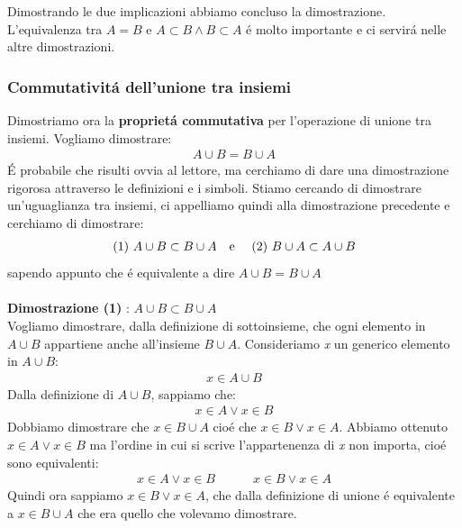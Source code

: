 \documentclass[twoside]{article} %
\begin{document}
	Dimostrando le due implicazioni abbiamo concluso la dimostrazione.\\ L'equivalenza tra $A=B$ e $A\subset B\wedge B\subset A$ \'e molto importante e ci servir\'a nelle altre dimostrazioni.
	\newpage
	
	\subsubsection{Commutativit\'a dell'unione tra insiemi}	
	 Dimostriamo ora la \textbf{propriet\'a commutativa} per l'operazione di unione tra insiemi. Vogliamo dimostrare:
	\begin{gather*}
		A\cup B = B\cup A
	\end{gather*}
	\'E probabile che risulti ovvia al lettore, ma cerchiamo di dare una dimostrazione rigorosa attraverso le definizioni e i simboli.
	Stiamo cercando di dimostrare un'uguaglianza tra insiemi, ci appelliamo quindi alla  dimostrazione precedente e cerchiamo di dimostrare:
	\begin{gather*}
		\text{(1) }A\cup B \subset B\cup A \text{\quad e \quad(2) } B\cup A \subset A\cup B
	\end{gather*}
	sapendo appunto che \'e equivalente a dire $A\cup B = B\cup A$\\ \\
	\textbf{Dimostrazione (1) }: $A\cup B \subset B\cup A$\\
	Vogliamo dimostrare, dalla definizione di sottoinsieme, che ogni elemento in $A\cup B$ appartiene anche all'insieme $B\cup A$. Consideriamo \textit{x} un generico elemento in $A\cup B$:
	\begin{gather*}
		x\in A\cup B
	\end{gather*}
	Dalla definizione di $A\cup B$, sappiamo che:
	\begin{gather*}
		x\in A \vee x\in B
	\end{gather*}
	Dobbiamo dimostrare che $x\in B\cup A$ cio\'e che $x\in B \vee x\in A$. Abbiamo ottenuto $x\in A \vee x\in B$ ma l'ordine in cui si scrive l'appartenenza di \textit{x} non importa, cio\'e sono equivalenti:
	\begin{gather*}
		x\in A\vee x\in B\qquad\quad x\in B\vee x\in A
	\end{gather*}
	Quindi ora sappiamo $x\in B\vee x\in A$, che dalla definizione di unione \'e equivalente a $x\in B\cup A$ che era quello che volevamo dimostrare.\\ \\
\end{document}
